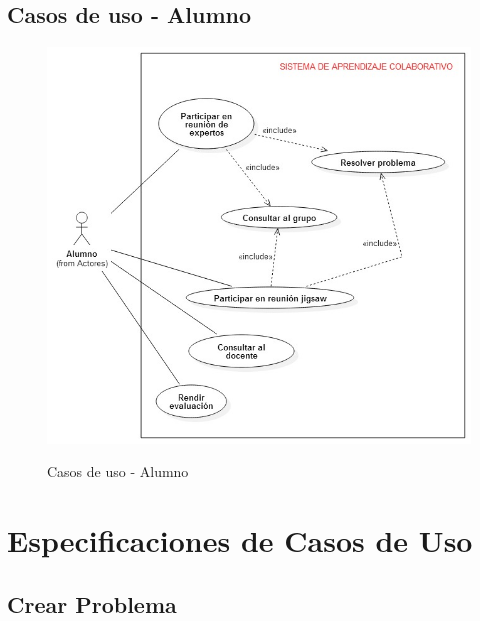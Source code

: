 \subsection{Casos de uso - Alumno}
\begin{figure}[!h]
  \centering
  \includegraphics[scale=0.6]{figuras/casosdeuso/DCU_Alumno.jpg}\\
  \caption[Casos de uso - Alumno]{Casos de uso - Alumno}
  \label{fig:cus-alumno}
\end{figure}
\clearpage
\section{Especificaciones de Casos de Uso}
\subsection{Crear Problema}


